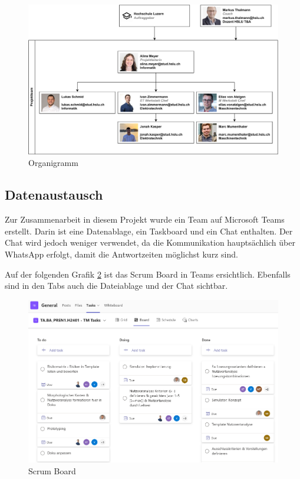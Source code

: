 \begin{figure}[H]
\centering
\includegraphics[width=\textwidth]{img/Projektorganisation.pdf}
\caption{Organigramm}
\label{fig:Organigramm}
\end{figure}

\subsection{Datenaustausch}

Zur Zusammenarbeit in diesem Projekt wurde ein Team auf Microsoft Teams erstellt.
Darin ist eine Datenablage, ein Taskboard und ein Chat enthalten. Der Chat wird jedoch weniger verwendet, da die Kommunikation hauptsächlich über WhatsApp erfolgt, damit die Antwortzeiten möglichst kurz sind.

Auf der folgenden Grafik \ref{fig:scrum-board} ist das Scrum Board in Teams ersichtlich. Ebenfalls sind in den Tabs auch die Dateiablage und der Chat sichtbar.

\begin{figure}[H]
\centering
\includegraphics[width=\textwidth]{img/scrum-board.png}
\caption{Scrum Board}
\label{fig:scrum-board}
\end{figure}

